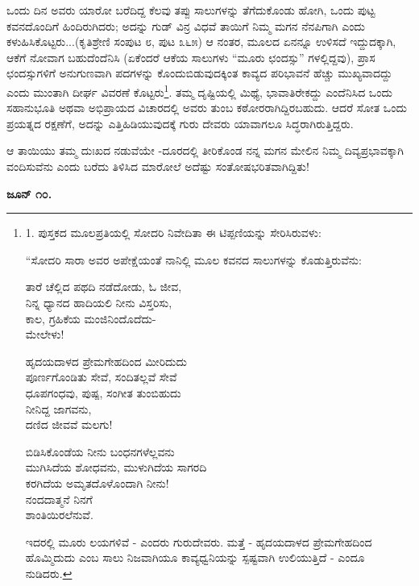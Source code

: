 ಒಂದು ದಿನ ಅವರು ಯಾರೋ ಬರೆದಿದ್ದ ಕೆಲವು ತಪ್ಪು ಸಾಲುಗಳನ್ನು ತೆಗೆದುಕೊಂಡು ಹೋಗಿ, ಒಂದು ಪುಟ್ಟ ಕವನದೊಂದಿಗೆ ಹಿಂದಿರುಗಿದರು; ಅದನ್ನು ಗುಡ್ ವಿನ್ರ ವಿಧವೆ ತಾಯಿಗೆ ನಿಮ್ಮ ಮಗನ ನೆನಪಿಗಾಗಿ ಎಂದು ಕಳುಹಿಸಿಕೊಟ್ಟರು...(ಕೃತಿಶ್ರೇಣಿ ಸಂಪುಟ ೮, ಪುಟ ೩೬೫) ಆ ನಂತರ, ಮೂಲದ ಏನನ್ನೂ ಉಳಿಸದೆ ಇದ್ದುದಕ್ಕಾಗಿ, ಆಕೆಗೆ ನೋವಾಗ ಬಹುದೆಂದೆನಿಸಿ (ಏಕೆಂದರೆ ಆಕೆಯ ಸಾಲುಗಳು “ಮೂರು ಛಂದಸ್ಸು” ಗಳಲ್ಲಿದ್ದವು), ಪ್ರಾಸ ಛಂದಸ್ಸುಗಳಿಗೆ ಅನುಗುಣವಾಗಿ ಪದಗಳನ್ನು ಕೊಂದುಬಿಡುವುದಕ್ಕಿಂತ ಕಾವ್ಯದ ಪರಿಭಾವನೆ ಹೆಚ್ಚು ಮುಖ್ಯವಾದದ್ದು ಎಂದು ಮುಂತಾಗಿ ದೀರ್ಘ ವಿವರಣೆ ಕೊಟ್ಟರು\footnote{1. ಪುಸ್ತಕದ ಮೂಲಪ್ರತಿಯಲ್ಲಿ ಸೋದರಿ ನಿವೇದಿತಾ ಈ ಟಿಪ್ಪಣಿಯನ್ನು ಸೇರಿಸಿರುವಳು:

“ಸೋದರಿ ಸಾರಾ ಅವರ ಅಪೇಕ್ಷೆಯಂತೆ ನಾನಿಲ್ಲಿ ಮೂಲ ಕವನದ ಸಾಲುಗಳನ್ನು ಕೊಡುತ್ತಿರುವೆನು:

\begin{myquote}
ತಾರೆ ಚೆಲ್ಲಿದ ಪಥದಿ ನಡೆದೋಡು, ಓ ಜೀವ,\\ನಿನ್ನ ಧ್ಯಾನದ ಹಾದಿಯಲಿ ನೀನು ವಿಸ್ತರಿಸು,\\ಕಾಲ, ಗ್ರಹಿಕೆಯ ಮಂಜಿನಿಂದೊದೆದು-\\ಮೇಲೇಳು!
\end{myquote}

\begin{myquote}
ಹೃದಯದಾಳದ ಪ್ರೇಮಗೇಹದಿಂದ ಮೀರಿದುದು\\ಪೂರ್ಣಗೊಂಡಿತು ಸೇವೆ, ಸಂದಿತಲ್ಲವೆ ಸೇವೆ\\ಧೂಪಗಂಧವು, ಪುಷ್ಪ, ಸಂಗೀತ ತುಂಬಿಹುದು\\ನೀನಿದ್ದ ಜಾಗವನು,\\ದಣಿದ ಜೀವವೆ ಮಲಗು!
\end{myquote}

\begin{myquote}
ಬಿಡಿಸಿಕೊಂಡೆಯ ನೀನು ಬಂಧನಗಳೆಲ್ಲವನು\\ಮುಗಿಸಿದೆಯ ಶೋಧವನು, ಮುಳುಗಿದೆಯ ಸಾಗರದಿ\\ಕರಗಿದೆಯ ಅಮೃತದೊಳೊಂದಾಗಿ ನೀನು!\\ನಂದದಾತ್ಮನೆ ನಿನಗೆ\\ಶಾಂತಿಯಿರಲೆನುವೆ.
\end{myquote}

ಇದರಲ್ಲಿ ಮೂರು ಲಯಗಳಿವೆ - ಎಂದರು ಗುರುದೇವರು. ಮತ್ತೆ - ಹೃದಯದಾಳದ ಪ್ರೇಮಗೇಹದಿಂದ ಹೊಮ್ಮಿದುದು ಎಂಬ ಸಾಲು ನಿಜವಾಗಿಯೂ ಕಾವ್ಯಧ್ವನಿಯನ್ನು ಸ್ಪಷ್ಟವಾಗಿ ಉಲಿಯುತ್ತಿದೆ - ಎಂದೂ ನುಡಿದರು.}. ತಮ್ಮ ದೃಷ್ಟಿಯಲ್ಲಿ ಮಿಥ್ಯೆ, ಭಾವಾತಿರೇಕದ್ದು ಎಂದೆನಿಸಿದ ಒಂದು ಸಹಾನುಭೂತಿ ಅಥವಾ ಅಭಿಪ್ರಾಯದ ವಿಚಾರದಲ್ಲಿ ಅವರು ತುಂಬ ಕಠೋರರಾಗಿದ್ದಿರಬಹುದು. ಆದರೆ ಸೋತ ಒಂದು ಪ್ರಯತ್ನದ ರಕ್ಷಣೆಗೆ, ಅದನ್ನು ಎತ್ತಿಹಿಡಿಯುವುದಕ್ಕೆ ಗುರು ದೇವರು ಯಾವಾಗಲೂ ಸಿದ್ಧರಾಗಿರುತ್ತಿದ್ದರು.

ಆ ತಾಯಿಯು ತಮ್ಮ ದುಃಖದ ನಡುವೆಯೇ -ದೂರದಲ್ಲಿ ತೀರಿಕೊಂಡ ನನ್ನ ಮಗನ ಮೇಲಿನ ನಿಮ್ಮ ದಿವ್ಯಪ್ರಭಾವಕ್ಕಾಗಿ ವಂದಿಸುವೆನು ಎಂದು ಬರೆದು ತಿಳಿಸಿದ ಮಾರೋಲೆ ಅದೆಷ್ಟು ಸಂತೋಷಭರಿತವಾಗಿದ್ದಿತು!

\textbf{ಜೂನ್ ೧೦.}

